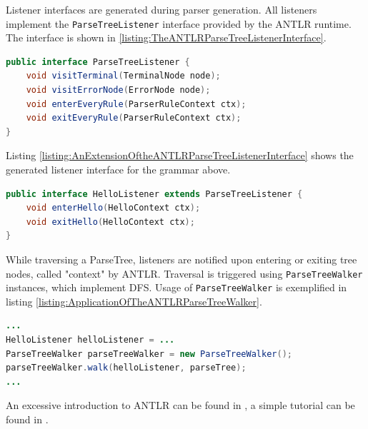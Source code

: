 Listener interfaces are generated during parser generation.
All listeners implement the \texttt{ParseTreeListener} interface provided by the \gls{ANTLR} runtime.
The interface is shown in \ref{listing:TheANTLRParseTreeListenerInterface}.
\begin{lstlisting}[language=Java,caption={The ANTLR ParseTreeListener interface},label={listing:TheANTLRParseTreeListenerInterface}]
public interface ParseTreeListener {
	void visitTerminal(TerminalNode node);
	void visitErrorNode(ErrorNode node);
	void enterEveryRule(ParserRuleContext ctx);
	void exitEveryRule(ParserRuleContext ctx);
}
\end{lstlisting}
Listing \ref{listing:AnExtensionOftheANTLRParseTreeListenerInterface} shows the generated listener interface for the grammar above.
\begin{lstlisting}[language=Java,caption={An extension of the ANTLR ParseTreeListener interface},label={listing:AnExtensionOftheANTLRParseTreeListenerInterface}]
public interface HelloListener extends ParseTreeListener {
    void enterHello(HelloContext ctx);
    void exitHello(HelloContext ctx);
}
\end{lstlisting}
While traversing a \gls{ParseTree}, listeners are notified upon entering or exiting tree nodes, called "context" by \gls{ANTLR}.
Traversal is triggered using \texttt{Parse\-Tree\-Walker} instances, which implement \gls{DFS}.
Usage of \texttt{Parse\-Tree\-Walker} is exemplified in listing \ref{listing:ApplicationOfTheANTLRParseTreeWalker}.
\begin{lstlisting}[language=Java,caption={Application of the ANTLR ParseTreeWalker},label={listing:ApplicationOfTheANTLRParseTreeWalker}]
...
HelloListener helloListener = ...
ParseTreeWalker parseTreeWalker = new ParseTreeWalker();
parseTreeWalker.walk(helloListener, parseTree);
...
\end{lstlisting}

An excessive introduction to \gls{ANTLR} can be found in \cite{Parr:2013:DAR:2501720}, a simple tutorial can be found in \cite{ANTLRv4GettingStarted}.